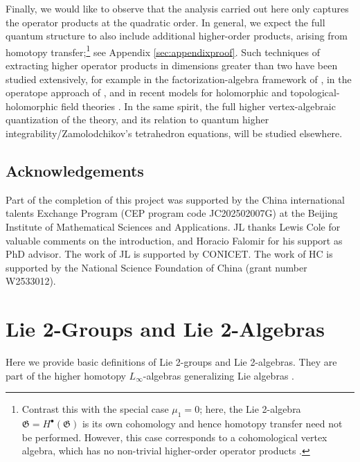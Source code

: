 \documentclass[11pt]{amsart}
\newcommand{\fG}{\mathfrak{G}}
\numberwithin{equation}{section}
\numberwithin{figure}{section}
\numberwithin{table}{section}
\theoremstyle{thm}
\numberwithin{equation}{subsection}
\theoremstyle{definition}
\theoremstyle{rem}
\begin{document}
Finally, we would like to observe that the analysis carried out here only captures the operator products at the quadratic order. In general, we expect the full quantum structure to also include additional higher-order products, arising from homotopy transfer;\footnote{Contrast this with the special case $\mu_1=0$; here, the Lie 2-algebra $\fG=H^\bullet(\fG)$ is its own cohomology and hence homotopy transfer need not be performed. However, this case corresponds to a cohomological vertex algebra, which has no non-trivial higher-order operator products \cite{Griffin:2025add}.} see Appendix \ref{sec:appendixproof}. Such techniques of extracting higher operator products in dimensions greater than two have been studied extensively, for example in the factorization-algebra framework of \cite{costello_gwilliam_2016}, in the operatope approach of \cite{Budzik:2022mpd,Gaiotto:2024gii}, and in recent models for holomorphic and topological-holomorphic field theories \cite{Felder:2025bsz,Costello:2020ndc,Zeng:2023qqp,Zeng:2021zef}. In the same spirit, the full higher vertex-algebraic quantization of 
the theory, and its relation to quantum higher integrability/Zamolodchikov's tetrahedron equations, will be studied elsewhere.





\subsection*{Acknowledgements}

Part of the completion of this project was supported by the China international talents Exchange Program (CEP program code JC202502007G) at the Beijing Institute of Mathematical Sciences and Applications. JL thanks Lewis Cole for valuable comments on the introduction, and Horacio Falomir for his support as PhD advisor. The work of JL is supported by CONICET. The work of HC is supported by the National Science Foundation of China (grant number W2533012).

\appendix


\section{Lie 2-Groups and Lie 2-Algebras}

\label{sec:appLie2alg}
Here we provide basic definitions of Lie 2-groups and Lie 2-algebras. They are part of the higher homotopy $L_\infty$-algebras generalizing Lie algebras \cite{Kim:2019owc,Baez:2004,Bai_2013}. 
\end{document}
